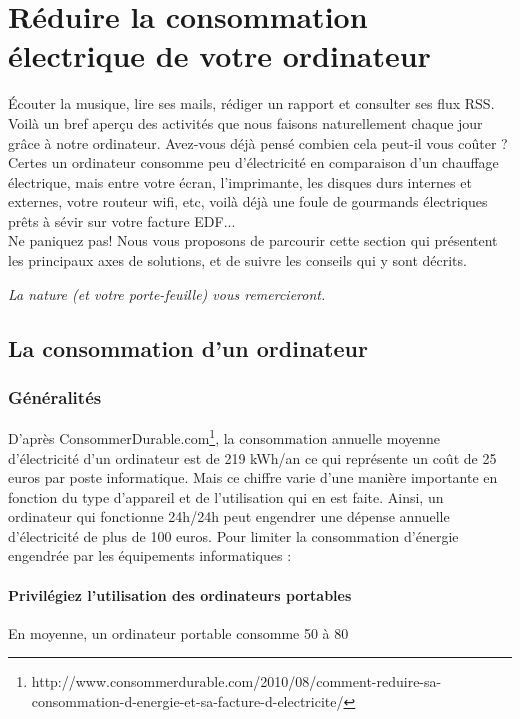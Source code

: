 \documentclass[a4paper,11pt,french]{report}
\begin{document}
\section[Réduire sa consommation]{Réduire la consommation électrique de votre ordinateur}

Écouter la musique, lire ses mails, rédiger un rapport et consulter ses flux RSS. Voilà un bref aperçu des activités que nous faisons naturellement chaque jour grâce à notre ordinateur. Avez-vous déjà pensé combien cela peut-il vous coûter ?
Certes un ordinateur consomme peu d'électricité en comparaison d'un chauffage électrique, mais entre votre écran, l'imprimante, les disques durs internes et externes, votre routeur wifi, etc, voilà déjà une foule de gourmands électriques prêts à sévir sur votre facture EDF...\\

Ne paniquez pas! Nous vous proposons de parcourir cette section qui présentent les principaux axes de solutions, et de suivre les conseils qui y sont décrits.\\
\begin{center}
\emph{La nature (et votre porte-feuille) vous remercieront.}
\end{center}

\subsection{La consommation d'un ordinateur}

\subsubsection{Généralités}
D'après ConsommerDurable.com\footnote{\textsf{http://www.consommerdurable.com/2010/08/comment-reduire-sa-consommation-d-energie-et-sa-facture-d-electricite/}}, la consommation annuelle moyenne d’électricité d’un ordinateur est de 219 kWh/an ce qui représente un coût de 25 euros par poste informatique. Mais ce chiffre varie d’une manière importante en fonction du type d’appareil et de l’utilisation qui en est faite. Ainsi, un ordinateur qui fonctionne 24h/24h peut engendrer une dépense annuelle d’électricité de plus de 100 euros. Pour limiter la consommation d’énergie engendrée par les équipements informatiques :

\paragraph{Privilégiez l’utilisation des ordinateurs portables}
En moyenne, un ordinateur portable consomme 50 à 80%
\end{document}
